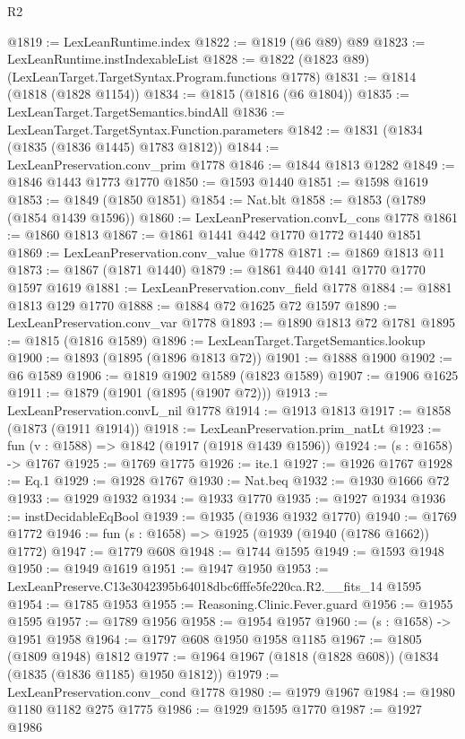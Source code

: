 \begin{lexlean}{R2}
\begin{coremodule}
@1819 := LexLeanRuntime.index
@1822 := @1819 (@6 @89) @89
@1823 := LexLeanRuntime.instIndexableList
@1828 := @1822 (@1823 @89) (LexLeanTarget.TargetSyntax.Program.functions @1778)
@1831 := @1814 (@1818 (@1828 @1154))
@1834 := @1815 (@1816 (@6 @1804))
@1835 := LexLeanTarget.TargetSemantics.bindAll
@1836 := LexLeanTarget.TargetSyntax.Function.parameters
@1842 := @1831 (@1834 (@1835 (@1836 @1445) @1783 @1812))
@1844 := LexLeanPreservation.conv_prim @1778
@1846 := @1844 @1813 @1282
@1849 := @1846 @1443 @1773 @1770
@1850 := @1593 @1440
@1851 := @1598 @1619
@1853 := @1849 (@1850 @1851)
@1854 := Nat.blt
@1858 := @1853 (@1789 (@1854 @1439 @1596))
@1860 := LexLeanPreservation.convL_cons @1778
@1861 := @1860 @1813
@1867 := @1861 @1441 @442 @1770 @1772 @1440 @1851
@1869 := LexLeanPreservation.conv_value @1778
@1871 := @1869 @1813 @11
@1873 := @1867 (@1871 @1440)
@1879 := @1861 @440 @141 @1770 @1770 @1597 @1619
@1881 := LexLeanPreservation.conv_field @1778
@1884 := @1881 @1813 @129 @1770
@1888 := @1884 @72 @1625 @72 @1597
@1890 := LexLeanPreservation.conv_var @1778
@1893 := @1890 @1813 @72 @1781
@1895 := @1815 (@1816 @1589)
@1896 := LexLeanTarget.TargetSemantics.lookup
@1900 := @1893 (@1895 (@1896 @1813 @72))
@1901 := @1888 @1900
@1902 := @6 @1589
@1906 := @1819 @1902 @1589 (@1823 @1589)
@1907 := @1906 @1625
@1911 := @1879 (@1901 (@1895 (@1907 @72)))
@1913 := LexLeanPreservation.convL_nil @1778
@1914 := @1913 @1813
@1917 := @1858 (@1873 (@1911 @1914))
@1918 := LexLeanPreservation.prim_natLt
@1923 := fun (v : @1588) => @1842 (@1917 (@1918 @1439 @1596))
@1924 := (s : @1658) -> @1767
@1925 := @1769 @1775
@1926 := ite.{1}
@1927 := @1926 @1767
@1928 := Eq.{1}
@1929 := @1928 @1767
@1930 := Nat.beq
@1932 := @1930 @1666 @72
@1933 := @1929 @1932
@1934 := @1933 @1770
@1935 := @1927 @1934
@1936 := instDecidableEqBool
@1939 := @1935 (@1936 @1932 @1770)
@1940 := @1769 @1772
@1946 := fun (s : @1658) => @1925 (@1939 (@1940 (@1786 @1662)) @1772)
@1947 := @1779 @608
@1948 := @1744 @1595
@1949 := @1593 @1948
@1950 := @1949 @1619
@1951 := @1947 @1950
@1953 := LexLeanPreserve.C13e3042395b64018dbc6fffe5fe220ca.R2.__fits_14 @1595
@1954 := @1785 @1953
@1955 := Reasoning.Clinic.Fever.guard
@1956 := @1955 @1595
@1957 := @1789 @1956
@1958 := @1954 @1957
@1960 := (s : @1658) -> @1951 @1958
@1964 := @1797 @608 @1950 @1958 @1185
@1967 := @1805 (@1809 @1948) @1812
@1977 := @1964 @1967 (@1818 (@1828 @608)) (@1834 (@1835 (@1836 @1185) @1950 @1812))
@1979 := LexLeanPreservation.conv_cond @1778
@1980 := @1979 @1967
@1984 := @1980 @1180 @1182 @275 @1775
@1986 := @1929 @1595 @1770
@1987 := @1927 @1986

\end{coremodule}
\end{lexlean}
